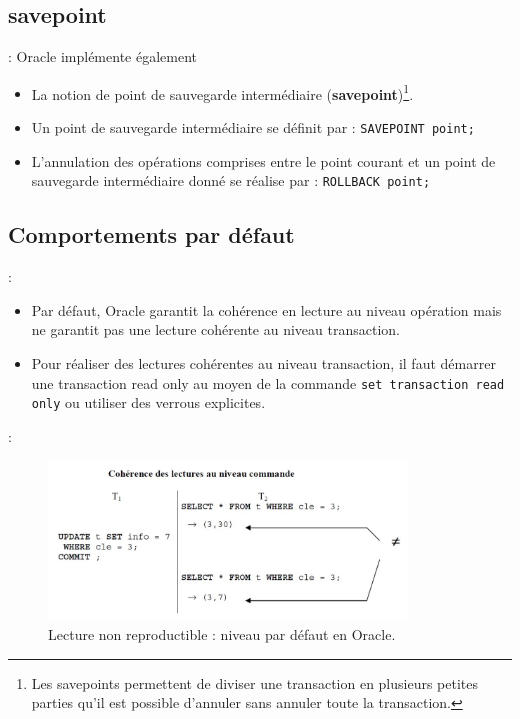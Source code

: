 \documentclass[10pt]{beamer}
\begin{document}
\subsection{savepoint}
\begin{frame}{\secname : \subsecname}
    Oracle implémente également
    \begin{itemize}
        \item La notion de point de sauvegarde intermédiaire (\textbf{savepoint})\footnote{ Les savepoints permettent de diviser une transaction en plusieurs petites parties qu'il est possible d'annuler sans annuler toute la transaction.}.
        \item Un point de sauvegarde intermédiaire se définit par : \lstinline[language=plsql]!SAVEPOINT point;!
        \item L'annulation des opérations comprises entre le point courant et un point de sauvegarde intermédiaire donné se réalise par : \lstinline[language=plsql]!ROLLBACK point;!
    \end{itemize}
\end{frame}
\subsection{Comportements par défaut}
\begin{frame}{\secname : \subsecname}
    \begin{itemize}
        \item Par défaut, Oracle garantit la cohérence en lecture au niveau opération mais ne garantit pas une lecture cohérente au niveau transaction.
        \item Pour réaliser des lectures cohérentes au niveau transaction, il faut démarrer une transaction read only au moyen de la commande \lstinline[language=plsql]!set transaction read only! ou utiliser des verrous explicites.
    \end{itemize}
\end{frame}

\begin{frame}{\secname : \subsecname}
    \begin{figure}
        \begin{center}
            \includegraphics[width=0.85\textwidth]{../assets/img/coherence-de-lecture.pdf}
            \caption{Lecture non reproductible : niveau par défaut en Oracle.}
        \end{center}
    \end{figure}
\end{frame}
\end{document}
